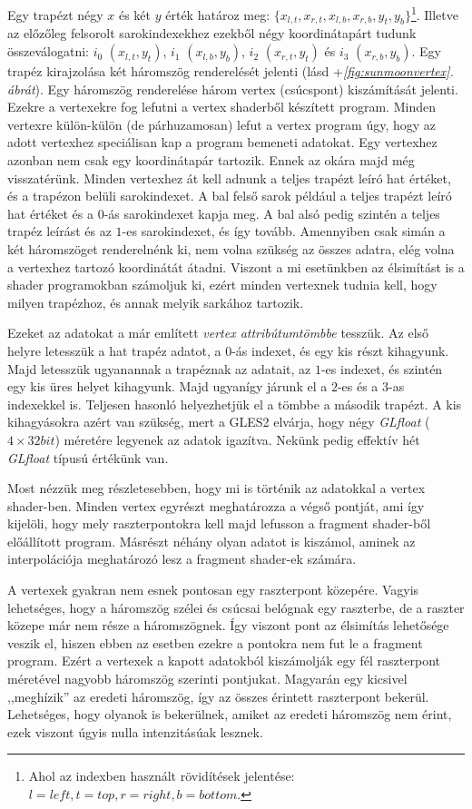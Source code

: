 \documentclass[12pt]{report}
\theoremstyle{definition}
\newcommand{\func}[1]{{\textsl{#1}}}
\begin{document}
Egy trapézt négy $x$ és két $y$ érték határoz meg: $\{x_{l,t}, x_{r,t},
x_{l,b}, x_{r,b}, y_{t}, y_{b}\}$\footnote{Ahol az indexben használt
rövidítések jelentése: $l=left, t=top, r=right, b=bottom$.}. Illetve az
előzőleg felsorolt sarokindexekhez ezekből négy koordinátapárt tudunk
összeválogatni: $i_0$ $(x_{l,t}, y_{t})$, $i_1$ $(x_{l,b}, y_{b})$, $i_2$
$(x_{r,t}, y_{t})$ és $i_3$ $(x_{r,b}, y_{b})$. Egy trapéz kirajzolása két
háromszög renderelését jelenti (lásd \az+\emph{\ref{fig:sunmoonvertex}. ábrát}). Egy
háromszög renderelése három vertex (csúcspont) kiszámítását jelenti. Ezekre a
vertexekre fog lefutni a vertex shaderből készített program.
Minden vertexre külön-külön (de párhuzamosan) lefut a vertex program úgy, hogy
az adott vertexhez speciálisan kap a program bemeneti adatokat. Egy vertexhez azonban
nem csak egy koordinátapár tartozik. Ennek az okára majd még visszatérünk.
Minden vertexhez át kell adnunk a teljes trapézt leíró hat értéket, és a
trapézon belüli sarokindexet. A bal felső sarok például a teljes trapézt leíró
hat értéket és a $0$-ás sarokindexet kapja meg. A bal alsó pedig szintén a
teljes trapéz leírást és az $1$-es sarokindexet, és így tovább. Amennyiben csak
simán a két háromszöget renderelnénk ki, nem volna szükség az összes adatra,
elég volna a vertexhez tartozó koordinátát átadni. Viszont a mi esetünkben az
élsimítást is a shader programokban számoljuk ki, ezért minden vertexnek tudnia
kell, hogy milyen trapézhoz, és annak melyik sarkához tartozik.

Ezeket az adatokat a már említett \emph{vertex attribútumtömbbe} tesszük. Az
első helyre letesszük a hat trapéz adatot, a $0$-ás indexet, és egy kis részt
kihagyunk. Majd letesszük ugyanannak a trapéznak az adatait, az $1$-es indexet,
és szintén egy kis üres helyet kihagyunk. Majd ugyanígy járunk el a $2$-es és a
$3$-as indexekkel is. Teljesen hasonló helyezhetjük el a tömbbe a második
trapézt. A kis kihagyásokra azért van szükség, mert a GLES2 elvárja, hogy négy
\func{GLfloat} ($4 \times 32 bit$) méretére legyenek az adatok igazítva. Nekünk pedig
effektív hét \func{GLfloat} típusú értékünk van.

Most nézzük meg részletesebben, hogy mi is történik az adatokkal a vertex
shader-ben. Minden vertex egyrészt meghatározza a végső pontját, ami így
kijelöli, hogy mely raszterpontokra kell majd lefusson a fragment shader-ből
előállított program. Másrészt néhány olyan adatot is kiszámol, aminek az
interpolációja meghatározó lesz a fragment shader-ek számára.

A vertexek gyakran nem esnek pontosan egy raszterpont közepére. Vagyis
lehetséges, hogy a háromszög szélei és csúcsai belógnak egy raszterbe, de a
raszter közepe már nem része a háromszögnek. Így viszont pont az élsimítás
lehetősége veszik el, hiszen ebben az esetben ezekre a pontokra nem fut le a
fragment program. Ezért a vertexek a kapott adatokból kiszámolják egy fél
raszterpont méretével nagyobb háromszög szerinti pontjukat. Magyarán egy
kicsivel ,,meghízik'' az eredeti háromszög, így az összes érintett raszterpont
bekerül. Lehetséges, hogy olyanok is bekerülnek, amiket az eredeti háromszög
nem érint, ezek viszont úgyis nulla intenzitásúak lesznek.
\end{document}
